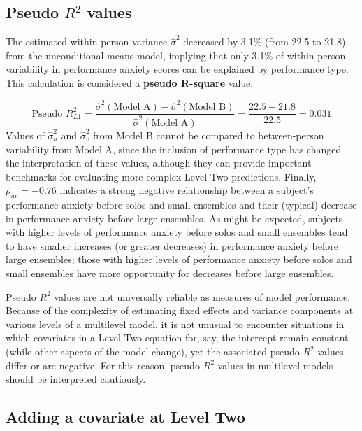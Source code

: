 \documentclass[
]{krantz}
\begin{document}
\hypertarget{pseudoR2}{%
\subsection{\texorpdfstring{Pseudo \(R^2\) values}{Pseudo R\^{}2 values}}\label{pseudoR2}}

The estimated within-person variance \(\hat{\sigma}^2\) decreased by 3.1\% (from 22.5 to 21.8) from the unconditional means model, implying that only 3.1\% of within-person variability in performance anxiety scores can be explained by performance type. This calculation is considered a \textbf{pseudo R-square}  value:

\begin{equation*}
\textrm{Pseudo }R^2_{L1} = \frac{\hat{\sigma}^{2}(\textrm{Model A})-\hat{\sigma}^{2}(\textrm{Model B})}{\hat{\sigma}^{2}(\textrm{Model A})} = \frac{22.5-21.8}{22.5} = 0.031
\end{equation*}
Values of \(\hat{\sigma}_{u}^{2}\) and \(\hat{\sigma}_{v}^{2}\) from Model B cannot be compared to between-person variability from Model A, since the inclusion of performance type has changed the interpretation of these values, although they can provide important benchmarks for evaluating more complex Level Two predictions. Finally, \(\hat{\rho}_{uv}=-0.76\) indicates a strong negative relationship between a subject's performance anxiety before solos and small ensembles and their (typical) decrease in performance anxiety before large ensembles. As might be expected, subjects with higher levels of performance anxiety before solos and small ensembles tend to have smaller increases (or greater decreases) in performance anxiety before large ensembles; those with higher levels of performance anxiety before solos and small ensembles have more opportunity for decreases before large ensembles.

Pseudo \(R^2\) values are not universally reliable as measures of model performance. Because of the complexity of estimating fixed effects and variance components at various levels of a multilevel model, it is not unusual to encounter situations in which covariates in a Level Two equation for, say, the intercept remain constant (while other aspects of the model change), yet the associated pseudo \(R^2\) values differ or are negative. For this reason, pseudo \(R^2\) values in multilevel models should be interpreted cautiously.

\hypertarget{modelc}{%
\subsection{Adding a covariate at Level Two}\label{modelc}}
\end{document}
